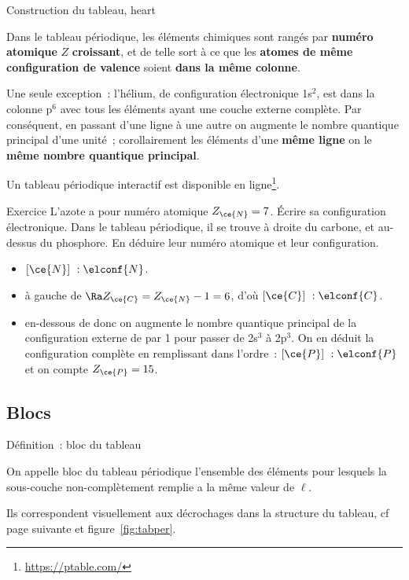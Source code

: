 \documentclass[../main/main.tex]{subfiles}
\begin{document}
\begin{tdefi}{Construction du tableau, heart}
    \begin{center}
        Dans le tableau périodique, les éléments chimiques sont rangés par
        \textbf{numéro atomique} $Z$ \textbf{croissant}, et de telle sort à ce
        que les \textbf{atomes de même configuration de valence} soient
        \textbf{dans la même colonne}.
    \end{center}
\end{tdefi}
Une seule exception~: l'hélium, de configuration électronique 1s$^2$, est dans
la colonne p$^6$ avec tous les éléments ayant une couche externe complète. \bigbreak
Par conséquent, en passant d'une ligne à une autre on augmente le nombre
quantique principal d'une unité~; corollairement les éléments d'une
\textbf{même ligne} on le \textbf{même nombre quantique principal}.

Un tableau périodique interactif est disponible en
ligne\footnote{\url{https://ptable.com/}}.

\begin{rexem}{Exercice}
    L'azote a pour numéro atomique $Z_{\ce{N}}=7$. Écrire sa configuration
    électronique. Dans le tableau périodique, il se trouve à droite du carbone,
    et au-dessus du phosphore. En déduire leur numéro atomique et leur
    configuration. \tcblower
    \begin{itemize}[label=$\diamond$]
        \item $[\ce{N}]~: \elconf{N}$.
        \item  {} à gauche de  $\Ra Z_{\ce{C}} = Z_{\ce{N}} - 1 = 6$, d'où
            $[\ce{C}]~: \elconf{C}$.
        \item {} en-dessous de  donc on augmente le nombre quantique
            principal de la configuration externe de  par 1 pour passer de
            2s$^3$ à 2p$^3$. On en déduit la configuration complète en
            remplissant dans l'ordre~: $[\ce{P}]~: \elconf{P}$ et on compte
            $Z_{\ce{P}} = 15$.
    \end{itemize}
\end{rexem}

\subsection{Blocs}

\begin{tdefi}{Définition~: bloc du tableau}
    \begin{center}
        On appelle bloc du tableau périodique l'ensemble des éléments pour
        lesquels la sous-couche non-complètement remplie a la même valeur de
        $\ell$.
    \end{center}
    Ils correspondent visuellement aux décrochages dans la structure du tableau,
    cf page suivante et figure~\ref{fig:tabper}.
\end{tdefi}
\end{document}
